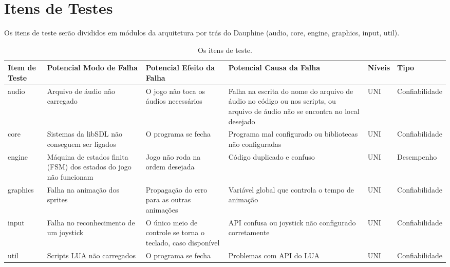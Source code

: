 \chapter[Itens de Testes]{Itens de Testes}


Os itens de teste serão divididos em módulos da arquitetura por trás do Dauphine (audio, core, engine, graphics, input, util). 

\begin{table}[h]
\centering
\begin{tabular}{|p{1.3cm}|p{3.4cm}|p{3.4cm}|p{3.4cm}|p{1.2cm}|p{2.5cm}|}
\hline
\textbf{Item de Teste} & \textbf{Potencial Modo de Falha} & \textbf{Potencial Efeito da Falha} & \textbf{Potencial Causa da Falha} & \textbf{Níveis} & \textbf{Tipo} \\ \hline
audio	& Arquivo de áudio não carregado & O jogo não toca os áudios necessários & Falha na escrita do nome do arquivo de áudio no código ou nos scripts, ou arquivo de áudio não se encontra no local desejado & UNI & Confiabilidade \\ \hline
core	& Sistemas da libSDL não conseguem ser ligados & O programa se fecha & Programa mal configurado ou bibliotecas não configuradas & UNI & Confiabilidade \\ \hline
engine	& Máquina de estados finita (FSM) dos estados do jogo não funcionam & Jogo não roda na ordem desejada & Código duplicado e confuso & UNI & Desempenho \\ \hline
graphics& Falha na animação dos sprites & Propagação do erro para as outras animações & Variável global que controla o tempo de animação & UNI & Confiabilidade \\ \hline
input	& Falha no reconhecimento de um joystick & O único meio de controle se torna o teclado, caso disponível & API confusa ou joystick não configurado corretamente & UNI & Confiabilidade \\ \hline
util	& Scripts LUA não carregados & O programa se fecha & Problemas com API do LUA & UNI & Confiabilidade \\ \hline
\end{tabular}
\caption{Os itens de teste.}
\label{itens_teste}
\end{table}
